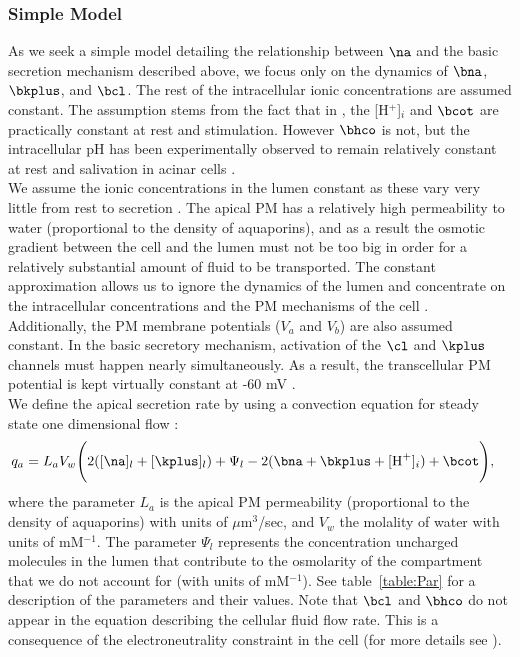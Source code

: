 \subsubsection*{Simple Model}
As we seek a simple model detailing the relationship between $\na$ and the basic secretion mechanism described above, we focus only on the dynamics of $\bna$, $\bkplus$, and $\bcl$. The rest of the intracellular ionic concentrations are assumed constant. The assumption stems from the fact that in \cite{siguenza2017Ae4}, the [H$^+$]$_i$ and $\bcot$ are practically constant at rest and stimulation. However $\bhco$ is not, but the intracellular pH has been experimentally observed to remain relatively constant at rest and salivation in acinar cells \citep{pena2015ae4}.  \\

We assume the ionic concentrations in the lumen constant as these vary very little from rest to secretion \citep{siguenza2017Ae4}.  The apical PM has a relatively high permeability to water (proportional to the density of aquaporins), and as a result the osmotic gradient between the cell and the lumen must not be too big in order for a relatively substantial amount of fluid to be transported. The constant approximation allows us to ignore the dynamics of the lumen and concentrate on the intracellular concentrations and the PM mechanisms of the cell  \citep{maclaren2012efficiency}.\\

Additionally, the PM membrane potentials ($V_a$ and $V_b$) are also assumed constant. In the basic secretory mechanism, activation of the $\cl$ and $\kplus$ channels must happen nearly simultaneously. As a result, the transcellular PM potential is kept virtually constant at -60 mV \citep{nauntofte1992regulation}.\\

We define the apical secretion rate by using a convection equation for steady state one dimensional flow \citep{kedem1958thermodynamic}:
\begin{align}
\label{eq:appendix_Q}
& q_a=  L_a V_w \Bigg( 2 ( [\na]_l + [\kplus]_l ) + \Psi_l - 2 ( \bna + \bkplus + [\text{H}^+]_i) + \bcot \Bigg),
\end{align}
where the parameter $L_a$ is the apical PM permeability (proportional to the density of aquaporins) with units of $\mu$m$^3$/sec, and $V_w$ the molality of water with units of mM$^{-1}$. The parameter $\Psi_l$ represents the concentration uncharged molecules in the lumen that contribute to the osmolarity of the compartment that we do not account for (with units of mM$^{-1}$). See table~\ref{table:Par} for a description of the parameters and their values. Note that $\bcl$ and $\bhco$ do not appear in the equation describing the cellular fluid flow rate. This is a consequence of the electroneutrality constraint in the cell (for more details see \cite{siguenza2017Ae4}). \\
 

